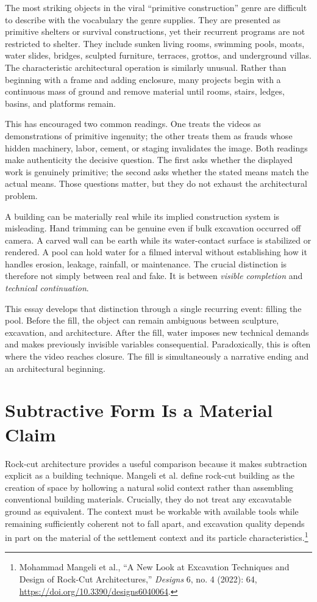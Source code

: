 \documentclass[11pt]{article}
\begin{document}
The most striking objects in the viral ``primitive construction'' genre are difficult to describe with the vocabulary the genre supplies. They are presented as primitive shelters or survival constructions, yet their recurrent programs are not restricted to shelter. They include sunken living rooms, swimming pools, moats, water slides, bridges, sculpted furniture, terraces, grottos, and underground villas. The characteristic architectural operation is similarly unusual. Rather than beginning with a frame and adding enclosure, many projects begin with a continuous mass of ground and remove material until rooms, stairs, ledges, basins, and platforms remain.

This has encouraged two common readings. One treats the videos as demonstrations of primitive ingenuity; the other treats them as frauds whose hidden machinery, labor, cement, or staging invalidates the image. Both readings make authenticity the decisive question. The first asks whether the displayed work is genuinely primitive; the second asks whether the stated means match the actual means. Those questions matter, but they do not exhaust the architectural problem.

A building can be materially real while its implied construction system is misleading. Hand trimming can be genuine even if bulk excavation occurred off camera. A carved wall can be earth while its water-contact surface is stabilized or rendered. A pool can hold water for a filmed interval without establishing how it handles erosion, leakage, rainfall, or maintenance. The crucial distinction is therefore not simply between real and fake. It is between \emph{visible completion} and \emph{technical continuation}.

This essay develops that distinction through a single recurring event: filling the pool. Before the fill, the object can remain ambiguous between sculpture, excavation, and architecture. After the fill, water imposes new technical demands and makes previously invisible variables consequential. Paradoxically, this is often where the video reaches closure. The fill is simultaneously a narrative ending and an architectural beginning.

\section{Subtractive Form Is a Material Claim}

Rock-cut architecture provides a useful comparison because it makes subtraction explicit as a building technique. Mangeli et al. define rock-cut building as the creation of space by hollowing a natural solid context rather than assembling conventional building materials. Crucially, they do not treat any excavatable ground as equivalent. The context must be workable with available tools while remaining sufficiently coherent not to fall apart, and excavation quality depends in part on the material of the settlement context and its particle characteristics.\footnote{Mohammad Mangeli et al., ``A New Look at Excavation Techniques and Design of Rock-Cut Architectures,'' \emph{Designs} 6, no. 4 (2022): 64, \url{https://doi.org/10.3390/designs6040064}.}
\end{document}
